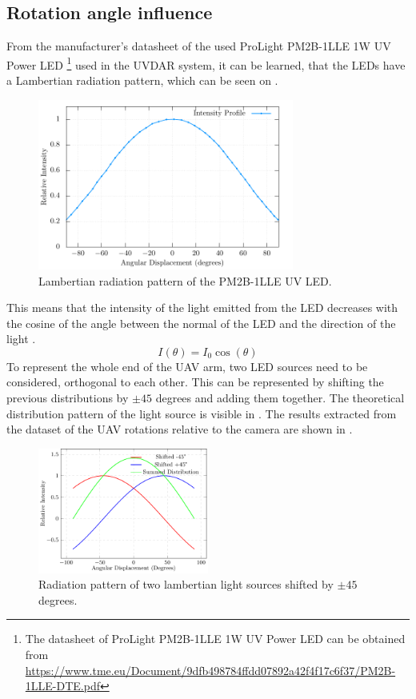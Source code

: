 \subsection{Rotation angle influence}
From the manufacturer's datasheet of the used ProLight PM2B-1LLE 1W \ac{UV} Power \ac{LED} \footnote{The datasheet of ProLight PM2B-1LLE 1W UV Power LED can be obtained from \url{https://www.tme.eu/Document/9dfb498784ffdd07892a42f4f17c6f37/PM2B-1LLE-DTE.pdf}}
used in the UVDAR system, it can be learned, that the \ac{LED}s have a Lambertian radiation pattern,
which can be seen on .
\begin {figure}[H]
	\centering
	\includegraphics[width=0.75\textwidth]{./fig/semestral/lambertian/_new_lambertian.pdf}
	\caption{Lambertian radiation pattern of the PM2B-1LLE UV LED.}
	\label{fig:lambertian}
\end{figure}
This means that the intensity of the light emitted from the \ac{LED} decreases with the cosine
of the angle between the normal of the \ac{LED} and the direction of the light .
\begin{equation}
	I(\theta) = I_0\cos(\theta)
	\label{eq:lambertian}
\end{equation}
To represent the whole end of the \ac{UAV} arm, two \ac{LED} sources need to be considered, orthogonal to each other.
This can be represented by shifting the previous distributions by $\pm 45$ degrees and adding them together. The 
theoretical distribution pattern of the light source is visible in . 
The results extracted from the dataset of the \ac{UAV} rotations relative to the camera are shown in .
\begin {figure}[H]
	\centering
	\includegraphics[width=0.50\textwidth]{./fig/semestral/lambertian/3lambertian.pdf}
	\caption{Radiation pattern of two lambertian light sources shifted by $\pm 45$ degrees.}
	\label{fig:lambert_combined}
\end{figure}

